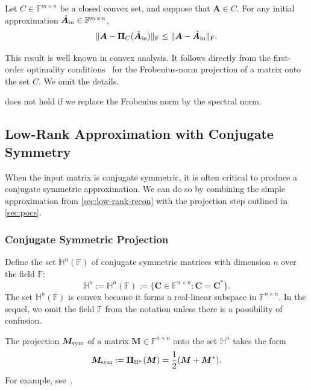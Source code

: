 \documentclass[final]{siamart1116}
\numberwithin{equation}{section}
\numberwithin{theorem}{section}
\numberwithin{figure}{section}
\newcommand{\F}{\mathbb{F}}
\newcommand{\mtx}[1]{\bm{#1}}
\newcommand{\norm}[1]{\Vert #1 \Vert}
\newcommand{\fnorm}[1]{\norm{#1}_{\mathrm{F}}}
\begin{document}
\begin{fact} \label{fact:convex-structure}
Let $C \in \F^{m \times n}$ be a closed convex set, and suppose that $\mtx{A} \in C$.
For any initial approximation $\hat{\mtx{A}}_{\rm in} \in \F^{m \times n}$,
\begin{equation} \label{eqn:convex-structure}
\fnorm{ \mtx{A} - \mtx{\Pi}_C(\hat{\mtx{A}}_{\rm in}) }
	\leq \fnorm{ \mtx{A} - \hat{\mtx{A}}_{\rm in} }.
\end{equation}
\end{fact}

This result is well known in convex analysis.  It follows directly from
the first-order optimality conditions~\cite[Sec.~4.2.3]{BV04:Convex-Optimization}
for the Frobenius-norm projection of a matrix onto the set $C$.
We omit the details.

\begin{warning}
 does not hold if we replace the Frobenius
norm by the spectral norm.
\end{warning}



\subsection{Low-Rank Approximation with Conjugate Symmetry}

When the input matrix is conjugate symmetric,
it is often critical to produce a conjugate symmetric approximation.
We can do so by combining the simple approximation from \cref{sec:low-rank-recon}
with the projection step outlined in \cref{sec:pocs}.

\subsubsection{Conjugate Symmetric Projection}

Define the set $\mathbb{H}^n(\F)$ of conjugate symmetric matrices with dimension $n$ over the field $\F$:
$$
\mathbb{H}^n := \mathbb{H}^n(\F) := \{ \mtx{C} \in \F^{n \times n} : \mtx{C} = \mtx{C}^* \}.
$$
The set $\mathbb{H}^n(\F)$ is convex because it forms a real-linear subspace in $\F^{n \times n}$.
In the sequel, we omit the field $\F$ from the notation unless there is a possibility of confusion.

The projection $\mtx{M}_{\rm sym}$ of a matrix $\mtx{M} \in \F^{n \times n}$
onto the set $\mathbb{H}^n$ takes the form
\begin{equation} \label{eqn:sym-part}
\mtx{M}_{\rm sym} := \mtx{\Pi}_{\mathbb{H}^n}(\mtx{M}) = \frac{1}{2} (\mtx{M} + \mtx{M}^*).
\end{equation}
For example, see~\cite[Sec.~2]{Hig89:Matrix-Nearness}.
\end{document}
